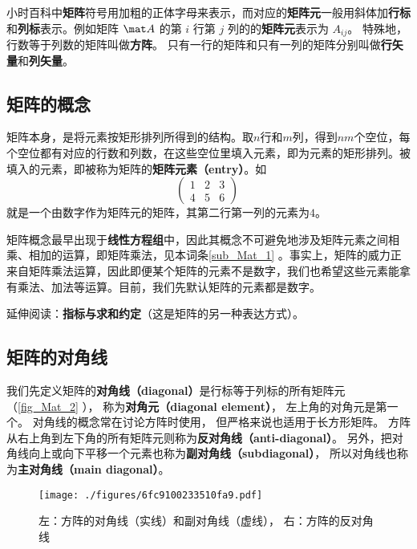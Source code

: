 
小时百科中\textbf{矩阵}符号用加粗的正体字母来表示，而对应的\textbf{矩阵元}一般用斜体加\textbf{行标}和\textbf{列标}表示。例如矩阵 $\mat A$ 的第 $i$ 行第 $j$ 列的的\textbf{矩阵元}表示为 $A_{ij}$。 特殊地， 行数等于列数的矩阵叫做\textbf{方阵}。 只有一行的矩阵和只有一列的矩阵分别叫做\textbf{行矢量}和\textbf{列矢量}。



\subsection{矩阵的概念}



矩阵本身，是将元素按矩形排列所得到的结构。取$n$行和$m$列，得到$nm$个空位，每个空位都有对应的行数和列数，在这些空位里填入元素，即为元素的矩形排列。被填入的元素，即被称为矩阵的\textbf{矩阵元素（entry）}。如
\begin{equation}
\begin{pmatrix}
1&2&3\\
4&5&6
\end{pmatrix}~
\end{equation}
就是一个由数字作为矩阵元的矩阵，其第二行第一列的元素为$4$。

矩阵概念最早出现于\textbf{线性方程组}中，因此其概念不可避免地涉及矩阵元素之间相乘、相加的运算，即矩阵乘法，见本词条\autoref{sub_Mat_1} 。事实上，矩阵的威力正来自矩阵乘法运算，因此即便某个矩阵的元素不是数字，我们也希望这些元素能拿有乘法、加法等运算。目前，我们先默认矩阵的元素都是数字。


延伸阅读：\textbf{指标与求和约定}（这是矩阵的另一种表达方式）。


\subsection{矩阵的对角线}
我们先定义矩阵的\textbf{对角线（diagonal）}是行标等于列标的所有矩阵元（\autoref{fig_Mat_2} ）， 称为\textbf{对角元（diagonal element）}， 左上角的对角元是第一个。 对角线的概念常在讨论方阵时使用， 但严格来说也适用于长方形矩阵。 方阵从右上角到左下角的所有矩阵元则称为\textbf{反对角线（anti-diagonal）}。 另外，把对角线向上或向下平移一个元素也称为\textbf{副对角线（subdiagonal）}， 所以对角线也称为\textbf{主对角线（main diagonal）}。

\begin{figure}[ht]
\centering
\texttt{[image: ./figures/6fc9100233510fa9.pdf]}
\caption{左：方阵的对角线（实线）和副对角线（虚线）， 右：方阵的反对角线} \label{fig_Mat_2}
\end{figure}

